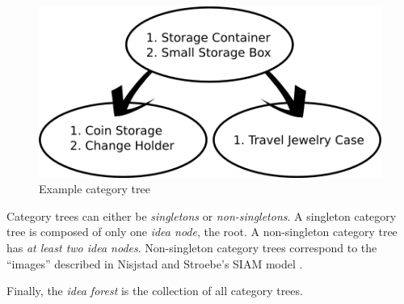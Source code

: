\begin{figure}[!h]
    \centering
    \includegraphics[width=0.9\columnwidth]{example_instances}
    \caption{Example category tree}
    \label{fig:example_instances}
\end{figure}

Category trees can either be \emph{singletons} or \emph{non-singletons}. A singleton category tree is composed of only one \emph{idea node}, the root. A non-singleton category tree has \emph{at least two idea nodes}. Non-singleton category trees correspond to the ``images'' described in Nisjstad and Stroebe's SIAM model \cite{nijstad_how_2006}.

Finally, the \emph{idea forest} is the collection of all category trees.





